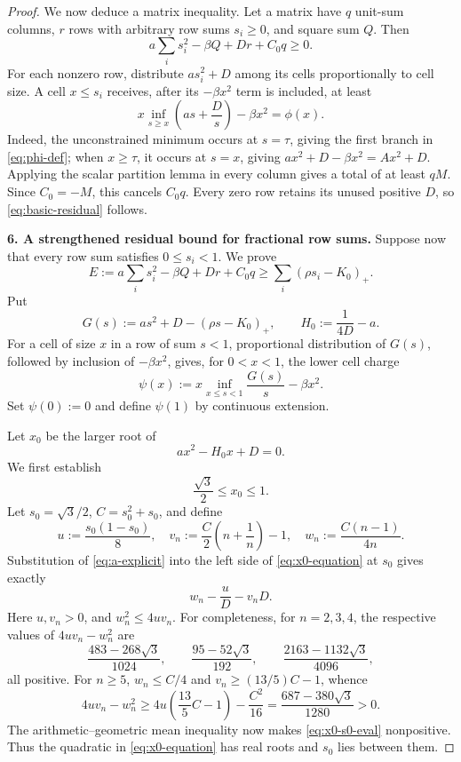 \documentclass[11pt]{article}
\theoremstyle{remark}
\begin{document}
\begin{proof}
We now deduce a matrix inequality.  Let a matrix have $q$ unit-sum
columns, $r$ rows with arbitrary row sums $s_i\geq0$, and square sum
$Q$.  Then
\begin{equation}\label{eq:basic-residual}
 a\sum_i s_i^2-\beta Q+Dr+C_0q\geq0.
\end{equation}
For each nonzero row, distribute $as_i^2+D$ among its cells
proportionally to cell size.  A cell $x\leq s_i$ receives, after its
$-\beta x^2$ term is included, at least
\[
 x\inf_{s\geq x}\left(as+\frac Ds\right)-\beta x^2
 =\phi(x).
\]
Indeed, the unconstrained minimum occurs at $s=\tau$, giving the first
branch in \eqref{eq:phi-def}; when $x\geq\tau$, it occurs at $s=x$,
giving $ax^2+D-\beta x^2=Ax^2+D$.  Applying the scalar partition lemma
in every column gives a total of at least $qM$.  Since $C_0=-M$, this
cancels $C_0q$.  Every zero row retains its unused positive $D$, so
\eqref{eq:basic-residual} follows.

\medskip
\noindent
\textbf{6. A strengthened residual bound for fractional row sums.}
Suppose now that every row sum satisfies $0\leq s_i<1$.  We prove
\begin{equation}\label{eq:strengthened-residual}
 E:=a\sum_i s_i^2-\beta Q+Dr+C_0q
 \geq\sum_i(\rho s_i-K_0)_+.
\end{equation}
Put
\[
 G(s):=as^2+D-(\rho s-K_0)_+,
 \qquad H_0:=\frac1{4D}-a.
\]
For a cell of size $x$ in a row of sum $s<1$, proportional
distribution of $G(s)$, followed by inclusion of $-\beta x^2$, gives,
for $0<x<1$, the lower cell charge
\begin{equation}\label{eq:psi-def-inf}
 \psi(x):=x\inf_{x\leq s<1}\frac{G(s)}s-\beta x^2.
\end{equation}
Set $\psi(0):=0$ and define \(\psi(1)\) by continuous extension.

Let $x_0$ be the larger root of
\begin{equation}\label{eq:x0-equation}
 ax^2-H_0x+D=0.
\end{equation}
We first establish
\begin{equation}\label{eq:x0-range}
 \frac{\sqrt3}{2}\leq x_0\leq1.
\end{equation}
Let $s_0=\sqrt3/2$, $C=s_0^2+s_0$, and define
\[
 u:=\frac{s_0(1-s_0)}8,
 \quad v_n:=\frac C2\left(n+\frac1n\right)-1,
 \quad w_n:=\frac{C(n-1)}{4n}.
\]
Substitution of \eqref{eq:a-explicit} into the left side of
\eqref{eq:x0-equation} at $s_0$ gives exactly
\begin{equation}\label{eq:x0-s0-eval}
 w_n-\frac uD-v_nD.
\end{equation}
Here $u,v_n>0$, and $w_n^2\leq4uv_n$.  For completeness, for
$n=2,3,4$, the respective values of $4uv_n-w_n^2$ are
\[
 \frac{483-268\sqrt3}{1024},\qquad
 \frac{95-52\sqrt3}{192},\qquad
 \frac{2163-1132\sqrt3}{4096},
\]
all positive.  For $n\geq5$, $w_n\leq C/4$ and
$v_n\geq(13/5)C-1$, whence
\[
 4uv_n-w_n^2
 \geq4u\left(\frac{13}{5}C-1\right)-\frac{C^2}{16}
 =\frac{687-380\sqrt3}{1280}>0.
\]
The arithmetic--geometric mean inequality now makes
\eqref{eq:x0-s0-eval} nonpositive.  Thus the quadratic in
\eqref{eq:x0-equation} has real roots and $s_0$ lies between them.


\end{proof}
\end{document}
